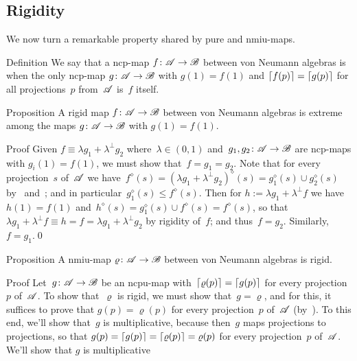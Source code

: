 \documentclass[a]{subfiles}
\begin{document}
\subsection{Rigidity}
\begin{parsec}%
\begin{point}%
We now turn a remarkable property shared
by pure and nmiu-maps.
\end{point}
\begin{point}[rigid]{Definition}%
We say that a ncp-map $f\colon \mathscr{A}\to\mathscr{B}$
between von Neumann algebras is 
when the only ncp-map $g\colon \mathscr{A}\to\mathscr{B}$
with $g(1)=f(1)$ and $\left\lceil f(p)\right\rceil=\left\lceil g(p)\right\rceil$ for all
projections~$p$ from~$\mathscr{A}$ is~$f$ itself.
\end{point}
\begin{point}{Proposition}%
A rigid map $f\colon \mathscr{A}\to\mathscr{B}$
between von Neumann algebras
is extreme among the maps $g\colon \mathscr{A}\to\mathscr{B}$
with $g(1)=f(1)$.
\begin{point}{Proof}%
Given $f\equiv \lambda g_1 + \lambda^\perp g_2$
where~$\lambda\in(0,1)$ 
and~$g_1,g_2\colon \mathscr{A}\to\mathscr{B}$
are ncp-maps with $g_i(1)=f(1)$,
we must show that~$f=g_1=g_2$.
Note that for every projection~$s$
of~$\mathscr{A}$
we have~$f^\diamond(s) = (\lambda g_1+\lambda^\perp g_2)^\diamond(s)
= g_1^\diamond(s)\cup g_2^\diamond(s)$
by~ and~;
and in particular~$g_1^\diamond(s)\leq f^\diamond(s)$.
Then for $h:=\lambda  g_1 + \lambda^\perp f$
we have $h(1)=f(1)$
and~$h^\diamond(s) = g_1^\diamond(s)\cup f^\diamond(s)
= f^\diamond(s)$,
so that~$\lambda g_1 + \lambda^\perp f \equiv 
h=f = \lambda g_1 +\lambda^\perp g_2$ by rigidity of~$f$;
and thus~$f=g_2$.
Similarly, $f=g_1$.\qed%
\end{point}
\end{point}
\begin{point}{Proposition}%
A nmiu-map $\varrho\colon \mathscr{A}\to\mathscr{B}$
between von Neumann algebras is rigid.
\begin{point}{Proof}%
Let~$g\colon \mathscr{A}\to\mathscr{B}$
be an ncpu-map
with~$\left\lceil\varrho(p)\right\rceil=\left\lceil g(p)\right\rceil$
for every projection~$p$ of~$\mathscr{A}$.
To show that~$\varrho$ is rigid,
we must show that~$g=\varrho$,
and for this, it suffices to prove that $g(p)=\varrho(p)$
for every projection~$p$ of~$\mathscr{A}$ (by~).
To this end, we'll show that~$g$ is multiplicative,
because then~$g$ maps projections to projections,
so that $g(p)=\left\lceil g(p)\right\rceil=\left\lceil\varrho(p)\right\rceil=\varrho(p)$
for every projection~$p$ of~$\mathscr{A}$.
We'll show that $g$ is multiplicative

\end{point}
\end{point}
\end{parsec}
\end{document}
